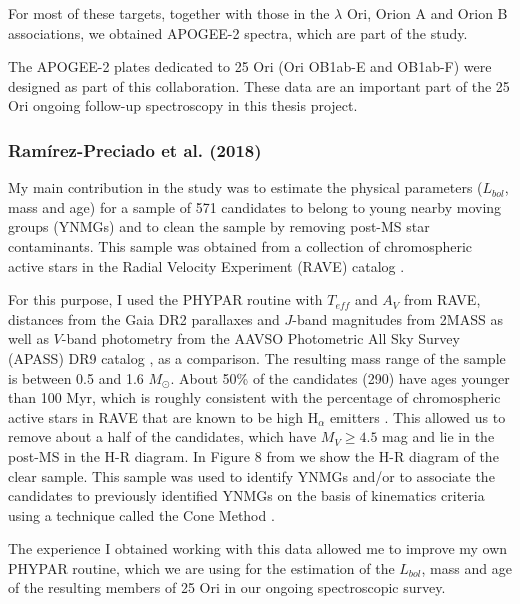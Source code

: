 \documentclass[12pt]{article}
\begin{document}
For most of these targets, together with those in the $\lambda$ Ori, Orion A and Orion B associations, we obtained APOGEE-2 spectra, which are part of the \citet{Kounkel2018} study. 

The APOGEE-2 plates dedicated to 25 Ori (Ori OB1ab-E and OB1ab-F) were designed as part of this collaboration. These data are an important part of the 25 Ori ongoing follow-up spectroscopy in this thesis project.

\subsubsection{Ram\'irez-Preciado et al. (2018)}
\label{sec:Ramirez-Preciado}
My main contribution in the \cite{Ramirez-Preciado2018} study was to estimate the physical parameters ($L_{bol}$, mass and age) for a sample of 571 candidates to belong to young nearby moving groups (\ac{YNMG}s) and to clean the sample by removing post-MS star contaminants. This sample was obtained from a collection of chromospheric active stars in the Radial Velocity Experiment (RAVE) catalog \citep{Kunder2017}.

For this purpose, I used the PHYPAR routine with $T_{eff}$ and $A_V$ from RAVE, distances from the Gaia DR2 parallaxes and $J$-band magnitudes from 2MASS as well as $V$-band photometry from the AAVSO Photometric All Sky Survey (APASS) DR9 catalog \citep{Henden2016}, as a comparison. The resulting mass range of the sample is between 0.5 and 1.6 $M_\odot$. About 50\% of the candidates (290) have ages younger than 100 Myr, which is roughly consistent with the percentage of chromospheric active stars in RAVE that are known to be high H$_\alpha$ emitters \citep{Zerjal2013}. This allowed us to remove about a half of the candidates, which have $M_V\ge4.5$ mag and lie in the post-MS in the H-R diagram. In Figure 8 from \citet{Ramirez-Preciado2018} we show the H-R diagram of the clear sample. This sample was used to identify YNMGs and/or to associate the candidates to previously identified YNMGs on the basis of kinematics criteria using a technique called the Cone Method \citep{Ramirez-Preciado2018}.

The experience I obtained working with this data allowed me to improve my own PHYPAR routine, which we are using for the estimation of the $L_{bol}$, mass and age of the resulting members of 25 Ori in our ongoing spectroscopic survey.
\end{document}
